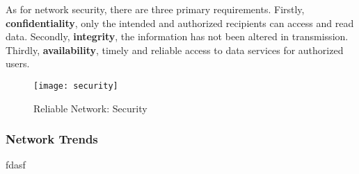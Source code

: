 \documentclass[crop=false]{standalone}
\begin{document}
\begin{flushleft}
As for network security, there are three primary requirements. Firstly, \textbf{\gls{confidentiality}}, only the intended and authorized recipients can access and read data. Secondly, \textbf{\gls{integrity}}, the information has not been altered in transmission. Thirdly, \textbf{\gls{availability}}, timely and reliable access to data services for authorized users.
\end{flushleft}
\begin{figure}[ht]
  \centering
  \texttt{[image: security]}
  \caption{Reliable Network: Security}
  \label{fig:Reliable Network: Security}
\end{figure}

\subsubsection{Network Trends}
fdasf
\end{document}

